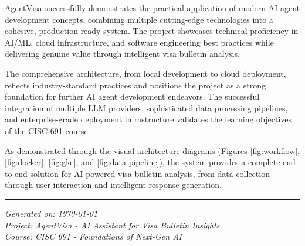 \documentclass[11pt,a4paper]{article}
\begin{document}
AgentVisa successfully demonstrates the practical application of modern AI agent development concepts, combining multiple cutting-edge technologies into a cohesive, production-ready system. The project showcases technical proficiency in AI/ML, cloud infrastructure, and software engineering best practices while delivering genuine value through intelligent visa bulletin analysis.

The comprehensive architecture, from local development to cloud deployment, reflects industry-standard practices and positions the project as a strong foundation for further AI agent development endeavors. The successful integration of multiple LLM providers, sophisticated data processing pipelines, and enterprise-grade deployment infrastructure validates the learning objectives of the CISC 691 course.

As demonstrated through the visual architecture diagrams (Figures \ref{fig:workflow}, \ref{fig:docker}, \ref{fig:gke}, and \ref{fig:data-pipeline}), the system provides a complete end-to-end solution for AI-powered visa bulletin analysis, from data collection through user interaction and intelligent response generation.

\vspace{1cm}

\hrule

\vspace{0.5cm}

\begin{center}
\textit{Generated on: \today} \\
\textit{Project: AgentVisa - AI Assistant for Visa Bulletin Insights} \\
\textit{Course: CISC 691 - Foundations of Next-Gen AI}
\end{center}
\end{document}
